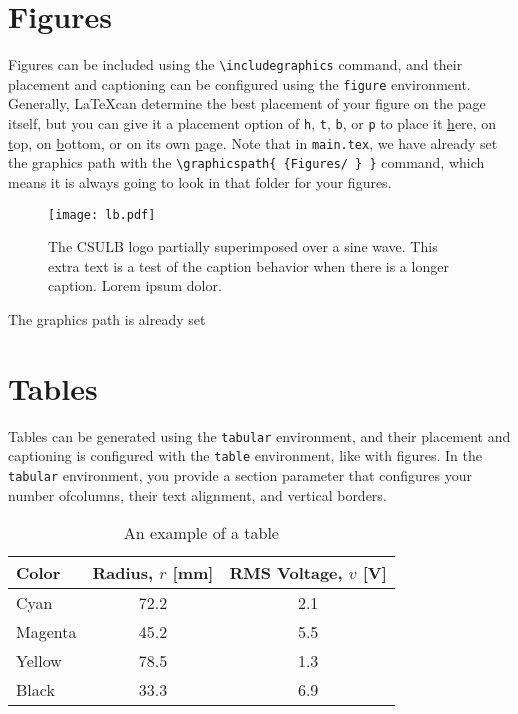 \section*{Figures}
Figures can be included using the \texttt{\textbackslash includegraphics} command, and their placement and captioning can be configured using the \texttt{figure} environment. Generally, \LaTeX can determine the best placement of your figure on the page itself, but you can give it a placement option of \texttt{h}, \texttt{t}, \texttt{b}, or \texttt{p} to place it \underline{h}ere, on \underline{t}op, on \underline{b}ottom, or on its own \underline{p}age. Note that in \texttt{main.tex}, we have already set the graphics path with the \texttt{\textbackslash graphicspath\{ \{Figures/ \} \}} command, which means it is always going to look in that folder for your figures.

\begin{figure}[h!]
	\centering
	\texttt{[image: lb.pdf]}
	\caption{The CSULB logo partially superimposed over a sine wave. This extra text is a test of the caption behavior when there is a longer caption. Lorem ipsum dolor.}
	\label{fig:exampleFig}
\end{figure}

The graphics path is already set

\section*{Tables}
Tables can be generated using the \texttt{tabular} environment, and their placement and captioning is configured with the \texttt{table} environment, like with figures. In the \texttt{tabular} environment, you provide a section parameter that configures your number ofcolumns, their text alignment, and vertical borders.

\begin{table}[h!]
	\centering
	\caption{An example of a table}
	\begin{tabular}{l c c}
		\hline
		Color	&  Radius, $r$ [mm] & RMS Voltage, $v$ [V] \\
		\hline
		Cyan	&	72.2	&	2.1 \\
		Magenta	&	45.2	&	5.5 \\
		Yellow	&	78.5	&	1.3 \\
		Black	&	33.3	&	6.9 \\
		\hline
	\end{tabular}
	\label{tab:exampleTable}
\end{table}

